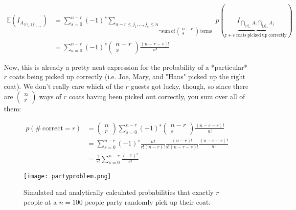 \begin{equation}
\begin{array}{rl}
\mathbb{E}(I_{A_{\{i\}_r,\{j\}_{n-r}}}) &= \sum_{s=0}^{n-r} (-1)^s \underbrace{\sum_{n-r\leq j_1,...,j_s\leq n}}_{\mathrm{sum\ of\ }\left(\begin{array}{l}n-r\\s\end{array}\right)\mathrm{\ terms\ \ }} p\left(\underbrace{I_{\bigcap_{\{i\}_r}A_i\bigcap_{\{j\}_s}A_j}}_{\mathrm{r+s\ coats\ picked\ up\ correctly}}\right)\\
&=\sum_{s=0}^{n-r} (-1)^s \left(\begin{array}{c}n-r\\s\end{array}\right)\frac{(n-r-s)!}{n!}
\end{array}
\end{equation}

Now, this is already a pretty neat expression for the probability of a *particular* $r$ coats being picked up correctly (i.e. Joe, Mary, and "Hans" picked up the right coat). We don't really care which of the $r$ guests got lucky, though, so since there are $\left(\begin{array}{c}n\\r\end{array}\right)$ ways of $r$ coats having been picked out correctly, you sum over all of them:

\begin{equation}
\begin{array}{ll}
p(\mathrm{\#\ correct} = r) &= \left(\begin{array}{c}n\\r\end{array}\right) \sum_{s=0}^{n-r} (-1)^s \left(\begin{array}{c}n-r\\s\end{array}\right)\frac{(n-r-s)!}{n!}\\
&= \sum_{s=0}^{n-r} (-1)^s \frac{n!}{r!(n-r)!}\frac{(n-r)!}{s!(n-r-s)!}\frac{(n-r-s)!}{n!}\\
&= \frac{1}{r!}\sum_{s=0}^{n-r} \frac{(-1)^s}{s!}
\end{array}
\end{equation}


\begin{figure}
\centering
    \texttt{[image: partyproblem.png]}
    \caption{Simulated and analytically calculated probabilities that exactly $r$ people at a $n=100$ people party randomly pick up their coat.}
    \label{fig:proba_partyproblem}
\end{figure}
